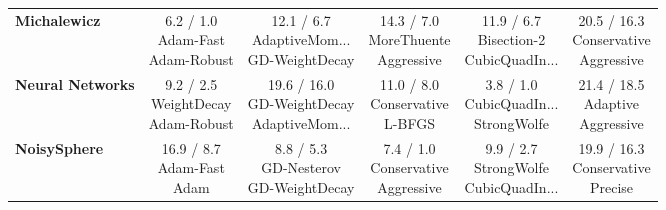\documentclass{article}
\begin{document}
\begin{longtable}{lccccc}
\textbf{Michalewicz} & \cellcolor{green!20} \makecell{6.2 / 1.0 \\ \scriptsize{Adam-Fast} \\ \scriptsize{Adam-Robust}}&  \makecell{12.1 / 6.7 \\ \scriptsize{AdaptiveMom...} \\ \scriptsize{GD-WeightDecay}}&  \makecell{14.3 / 7.0 \\ \scriptsize{MoreThuente} \\ \scriptsize{Aggressive}}&  \makecell{11.9 / 6.7 \\ \scriptsize{Bisection-2} \\ \scriptsize{CubicQuadIn...}}& \cellcolor{red!15} \makecell{20.5 / 16.3 \\ \scriptsize{Conservative} \\ \scriptsize{Aggressive}} \\
\textbf{Neural Networks} &  \makecell{9.2 / 2.5 \\ \scriptsize{WeightDecay} \\ \scriptsize{Adam-Robust}}&  \makecell{19.6 / 16.0 \\ \scriptsize{GD-WeightDecay} \\ \scriptsize{AdaptiveMom...}}&  \makecell{11.0 / 8.0 \\ \scriptsize{Conservative} \\ \scriptsize{L-BFGS}}& \cellcolor{green!20} \makecell{3.8 / 1.0 \\ \scriptsize{CubicQuadIn...} \\ \scriptsize{StrongWolfe}}& \cellcolor{red!15} \makecell{21.4 / 18.5 \\ \scriptsize{Adaptive} \\ \scriptsize{Aggressive}} \\
\textbf{NoisySphere} &  \makecell{16.9 / 8.7 \\ \scriptsize{Adam-Fast} \\ \scriptsize{Adam}}&  \makecell{8.8 / 5.3 \\ \scriptsize{GD-Nesterov} \\ \scriptsize{GD-WeightDecay}}& \cellcolor{green!20} \makecell{7.4 / 1.0 \\ \scriptsize{Conservative} \\ \scriptsize{Aggressive}}&  \makecell{9.9 / 2.7 \\ \scriptsize{StrongWolfe} \\ \scriptsize{CubicQuadIn...}}& \cellcolor{red!15} \makecell{19.9 / 16.3 \\ \scriptsize{Conservative} \\ \scriptsize{Precise}} \\

\end{longtable}
\end{document}
